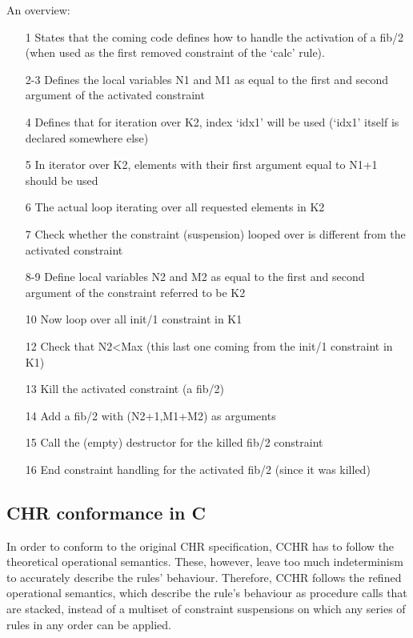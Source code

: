 \documentclass{llncs}
\begin{document}
An overview: \begin{itemize}
  \item[1] States that the coming code defines how to handle the activation of a fib/2 (when used as the first removed constraint of the `calc' rule).
  \item[2-3] Defines the local variables N1 and M1 as equal to the first and second argument of the activated constraint
  \item[4] Defines that for iteration over K2, index `idx1' will be used (`idx1' itself is declared somewhere else)
  \item[5] In iterator over K2, elements with their first argument equal to N1+1 should be used
  \item[6] The actual loop iterating over all requested elements in K2
  \item[7] Check whether the constraint (suspension) looped over is different from the activated constraint
  \item[8-9] Define local variables N2 and M2 as equal to the first and second argument of the constraint referred to be K2
  \item[10] Now loop over all init/1 constraint in K1
  \item[12] Check that N2<Max (this last one coming from the init/1 constraint in K1)
  \item[13] Kill the activated constraint (a fib/2)
  \item[14] Add a fib/2 with (N2+1,M1+M2) as arguments
  \item[15] Call the (empty) destructor for the killed fib/2 constraint
  \item[16] End constraint handling for the activated fib/2 (since it was killed)
\end{itemize}

\subsection{CHR conformance in C}

In order to conform to the original CHR specification, CCHR has to follow the theoretical operational semantics. These,
however, leave too much indeterminism to accurately describe the rules' behaviour. Therefore, CCHR follows the refined
operational semantics, which describe the rule's behaviour as procedure calls that are stacked, instead of a multiset
of constraint suspensions on which any series of rules in any order can be applied.
\end{document}
